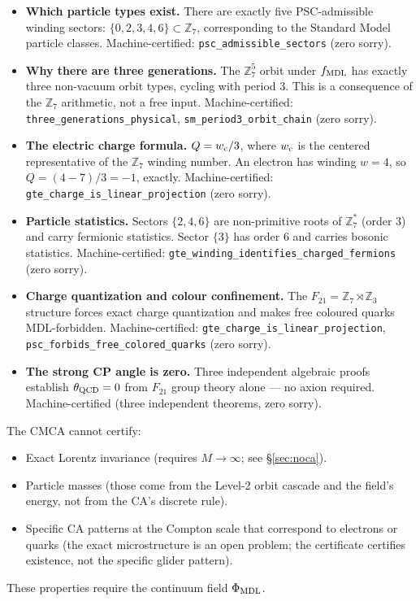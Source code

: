 \documentclass[11pt,a4paper]{article}
\newcommand{\lean}[1]{\texttt{#1}}
\newcommand{\PhiMDL}{\Phi_{\rm MDL}}
\newcommand{\ZS}{\mathbb{Z}_7}
\theoremstyle{definition}
\begin{document}
\begin{itemize}[itemsep=4pt]
  \item \textbf{Which particle types exist.}
    There are exactly five PSC-admissible winding sectors:
    $\{0, 2, 3, 4, 6\} \subset \ZS$,
    corresponding to the Standard Model particle classes.
    Machine-certified: \lean{psc\_admissible\_sectors} (zero sorry).

  \item \textbf{Why there are three generations.}
    The $\ZS^5$ orbit under $f_{\rm MDL}$ has exactly three non-vacuum orbit types,
    cycling with period 3.  This is a consequence of the $\ZS$ arithmetic, not a
    free input.  Machine-certified:
    \lean{three\_generations\_physical}, \lean{sm\_period3\_orbit\_chain} (zero sorry).

  \item \textbf{The electric charge formula.}
    $Q = w_{\rm c}/3$, where $w_{\rm c}$ is the centered representative of the
    $\ZS$ winding number.
    An electron has winding $w = 4$, so $Q = (4-7)/3 = -1$, exactly.
    Machine-certified: \lean{gte\_charge\_is\_linear\_projection} (zero sorry).

  \item \textbf{Particle statistics.}
    Sectors $\{2, 4, 6\}$ are non-primitive roots of $\ZS^*$ (order 3) and carry
    fermionic statistics.  Sector $\{3\}$ has order 6 and carries bosonic statistics.
    Machine-certified: \lean{gte\_winding\_identifies\_charged\_fermions} (zero sorry).

  \item \textbf{Charge quantization and colour confinement.}
    The $F_{21} = \ZS \rtimes \mathbb{Z}_3$ structure forces exact charge
    quantization and makes free coloured quarks MDL-forbidden.
    Machine-certified: \lean{gte\_charge\_is\_linear\_projection},
    \lean{psc\_forbids\_free\_colored\_quarks} (zero sorry).

  \item \textbf{The strong CP angle is zero.}
    Three independent algebraic proofs establish $\theta_{\rm QCD} = 0$ from
    $F_{21}$ group theory alone --- no axion required.
    Machine-certified (three independent theorems, zero sorry).
\end{itemize}

\begin{tcolorbox}[colback=boxteal,colframe=teal!50!black,title=What Level 1 cannot certify]
The CMCA cannot certify:
\begin{itemize}
  \item Exact Lorentz invariance (requires $M \to \infty$; see §\ref{sec:noca}).
  \item Particle masses (those come from the Level-2 orbit cascade and the field's
    energy, not from the CA's discrete rule).
  \item Specific CA patterns at the Compton scale that correspond to electrons
    or quarks (the exact microstructure is an open problem; the certificate
    certifies existence, not the specific glider pattern).
\end{itemize}
These properties require the continuum field $\PhiMDL$.
\end{tcolorbox}
\end{document}
